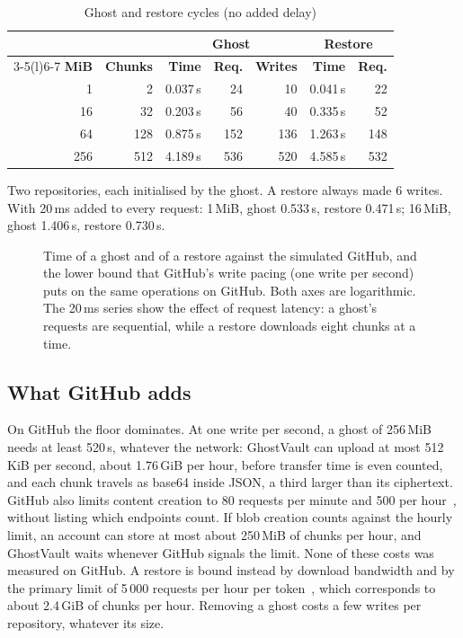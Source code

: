 \begin{table}[t]
\caption{Ghost and restore cycles (no added delay)}\label{tab:cycles}
\centering\footnotesize
\setlength{\tabcolsep}{4.2pt}
\begin{tabular}{@{}rrrrrrr@{}}
\toprule
& & \multicolumn{3}{c}{\textbf{Ghost}} & \multicolumn{2}{c}{\textbf{Restore}} \\
\cmidrule(lr){3-5}\cmidrule(l){6-7}
\textbf{MiB} & \textbf{Chunks} & \textbf{Time} & \textbf{Req.} & \textbf{Writes} & \textbf{Time} &
\textbf{Req.} \\
\midrule
1 & 2 & 0.037\,s & 24 & 10 & 0.041\,s & 22 \\
16 & 32 & 0.203\,s & 56 & 40 & 0.335\,s & 52 \\
64 & 128 & 0.875\,s & 152 & 136 & 1.263\,s & 148 \\
256 & 512 & 4.189\,s & 536 & 520 & 4.585\,s & 532 \\
\bottomrule
\end{tabular}

\vspace{2pt}\raggedright\scriptsize Two repositories, each initialised by the ghost. A restore always
made 6 writes. With 20\,ms added to every request: 1\,MiB, ghost 0.533\,s, restore 0.471\,s;
16\,MiB, ghost 1.406\,s, restore 0.730\,s.
\end{table}

\begin{figure}[t]
\centering

\caption{Time of a ghost and of a restore against the simulated GitHub, and the lower bound that
GitHub's write pacing (one write per second) puts on the same operations on GitHub. Both axes are
logarithmic. The 20\,ms series show the effect of request latency: a ghost's requests are sequential,
while a restore downloads eight chunks at a time.}
\label{fig:perf}
\end{figure}

\subsection{What GitHub adds}
On GitHub the floor dominates. At one write per second, a ghost of 256\,MiB needs at least 520\,s,
whatever the network: GhostVault can upload at most 512\,KiB per second, about 1.76\,GiB per hour,
before transfer time is even counted, and each chunk travels as base64 inside JSON, a third larger
than its ciphertext. GitHub also limits content creation to 80 requests per minute and 500 per
hour~\cite{gh-rate}, without listing which endpoints count. If blob creation counts against the hourly
limit, an account can store at most about 250\,MiB of chunks per hour, and GhostVault waits whenever
GitHub signals the limit. None of these costs was measured on GitHub. A restore is bound instead by
download bandwidth and by the primary limit of 5\,000 requests per hour per token~\cite{gh-rate},
which corresponds to about 2.4\,GiB of chunks per hour. Removing a ghost costs a few writes per
repository, whatever its size.

